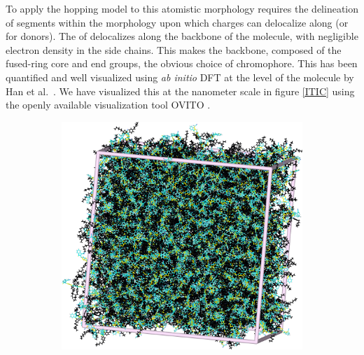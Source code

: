 To apply the hopping model to this atomistic morphology requires the
delineation of segments within the morphology upon which charges can delocalize along  (or 
 for donors).   
The  of  delocalizes along the backbone of the molecule, with
negligible electron density in the side chains. This makes the backbone,
composed of the fused-ring core and end groups, the obvious choice of chromophore.
This has been quantified and well visualized using \textit{ab
initio} DFT at the level of the molecule by Han et al.~\cite{Han2019}.
We have visualized this at the nanometer scale in figure \ref{ITIC} using the openly
available visualization tool OVITO \cite{Stukowski2010a}. 
\begin{figure}
\centering
\begin{subfigure}{.5\textwidth}
    \includegraphics[width=\textwidth]{figures/ITIC-blackedout-unwrapped-allatom.png}
\end{subfigure}%
\begin{subfigure}{.5\textwidth}

\end{subfigure}
\end{figure}
